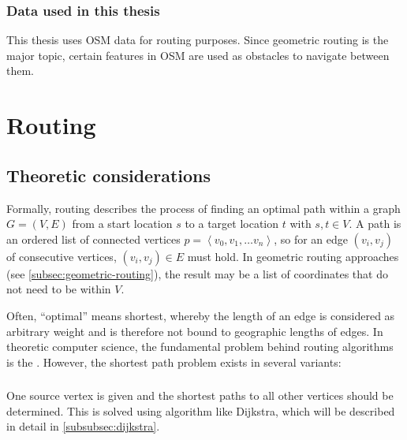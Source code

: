 		\subsubsection{Data used in this thesis}
		
			This thesis uses OSM data for routing purposes.
			Since geometric routing is the major topic, certain features in OSM are used as obstacles to navigate between them.
			

\section{Routing}

	
	\subsection{Theoretic considerations}
	\label{subsec:routing-theoretic-considerations}
	
		Formally, routing describes the process of finding an optimal path within a graph $G=(V, E)$ from a start location $s$ to a target location $t$ with $s, t \in V$.
		A path is an ordered list of connected vertices $p=\left\langle v_0, v_1, \dots v_n \right\rangle$, so for an edge $(v_i, v_j)$ of consecutive vertices, $(v_i, v_j) \in E$ must hold.
		In geometric routing approaches (see \cref{subsec:geometric-routing}), the result may be a list of coordinates that do not need to be within $V$.
		
		Often, \enquote{optimal} means shortest, whereby the length of an edge is considered as arbitrary weight and is therefore not bound to geographic lengths of edges.
		In theoretic computer science, the fundamental problem behind routing algorithms is the .
		However, the shortest path problem exists in several variants\cite[644]{cormen-introduction-to-alg}:
		
		\subsubsection{}
		\label{subsubsec:single-source-shortest-path}
		
			One source vertex is given and the shortest paths to all other vertices should be determined.
			This is solved using algorithm like Dijkstra, which will be described in detail in \cref{subsubsec:dijkstra}.
		
